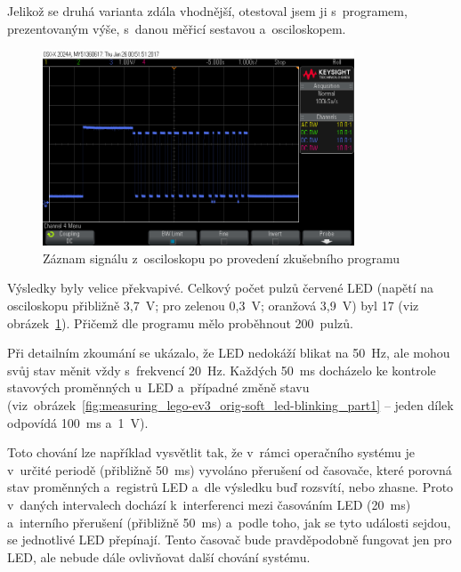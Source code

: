 Jelikož se druhá varianta zdála vhodnější, otestoval jsem ji s~programem, prezentovaným výše, s~danou měřicí sestavou a~osciloskopem. 

\begin{figure}[h]
	\centering
	\includegraphics[width=350px]{images/measuring-oscilloscope_ev3-software_led-blinking_all.png}
	\caption[Záznam signálu z~osciloskopu po provedení zkušebního programu]{Záznam signálu z~osciloskopu po provedení zkušebního programu}
	\label{fig:measuring_lego-ev3_orig-soft_led-blinking_all}
\end{figure}

Výsledky byly velice překvapivé. Celkový počet pulzů červené LED (napětí na osciloskopu přibližně 3,7~V; pro zelenou 0,3~V; oranžová 3,9~V) byl 17 
(viz obrázek~\ref{fig:measuring_lego-ev3_orig-soft_led-blinking_all}). Přičemž dle programu mělo proběhnout 200~pulzů.  

Při detailním zkoumání se ukázalo, že LED nedokáží blikat na 50~Hz, ale mohou svůj stav měnit vždy s~frekvencí 20~Hz. 
Každých 50~ms docházelo ke kontrole stavových proměnných u~LED a~případné změně stavu (viz~obrázek~\ref{fig:measuring_lego-ev3_orig-soft_led-blinking_part1} -- jeden dílek odpovídá 100~ms a~1~V).

Toto chování lze například vysvětlit tak, že v~rámci operačního systému  je v~určité periodě (přibližně 50~ms) vyvoláno přerušení od časovače, které porovná stav proměnných a~registrů LED a~dle výsledku buď rozsvítí, nebo zhasne. 
Proto v~daných intervalech dochází k~interferenci mezi časováním LED (20~ms) a~interního přerušení (přibližně 50~ms) a~podle toho, jak se tyto události sejdou, se jednotlivé LED přepínají.
Tento časovač bude pravděpodobně fungovat jen pro LED, ale nebude dále ovlivňovat další chování systému.
 

